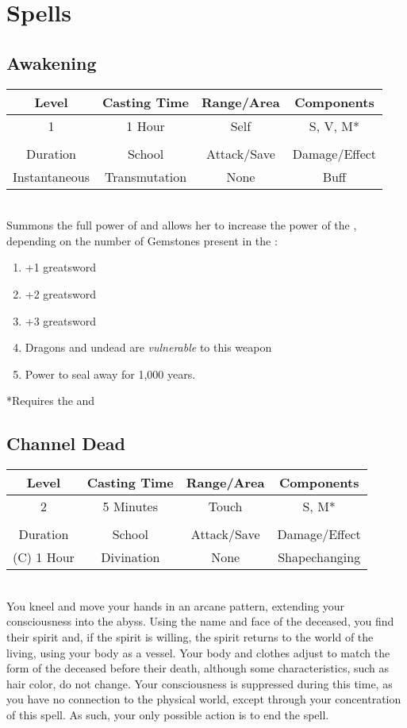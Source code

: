 \section{Spells}
\subsection{Awakening}
\label{spells:awakening}
\begin{tabular}{c|c|c|c}
Level & Casting Time & Range/Area & Components \\\hline
1 & 1 Hour & Self & S, V, M* \\
\\
Duration & School & Attack/Save & Damage/Effect \\\hline
Instantaneous & Transmutation & None & Buff \end{tabular}\\

Summons the full power of  and allows her to increase the power of the , depending on the number of Gemstones present in the :
\begin{enumerate}[(1)]
\item +1 greatsword
\item +2 greatsword
\item +3 greatsword
\item Dragons and undead are \textit{vulnerable} to this weapon
\item Power to seal away  for 1,000 years.
\end{enumerate}

*Requires the  and 

\subsection{Channel Dead}
\label{spells:channel}
\begin{tabular}{c|c|c|c}
Level & Casting Time & Range/Area & Components \\\hline
2 & 5 Minutes & Touch & S, M* \\
\\
Duration & School & Attack/Save & Damage/Effect \\\hline
(C) 1 Hour & Divination & None & Shapechanging \end{tabular}\\

You kneel and move your hands in an arcane pattern, extending your consciousness into the abyss. Using the name and face of the deceased, you find their spirit and, if the spirit is willing, the spirit returns to the world of the living, using your body as a vessel. Your body and clothes adjust to match the form of the deceased before their death, although some characteristics, such as hair color, do not change. Your consciousness is suppressed during this time, as you have no connection to the physical world, except through your concentration of this spell. As such, your only possible action is to end the spell.


